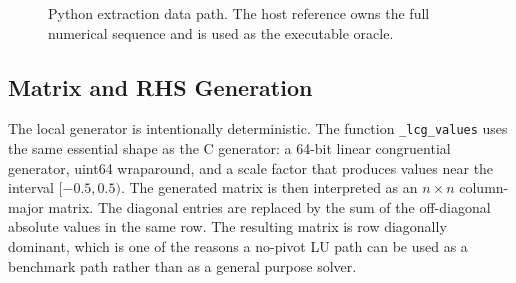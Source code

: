 \documentclass[11pt]{article}
\newcommand{\code}[1]{\texttt{#1}}
\begin{document}
\begin{figure}[htbp]
\centering
{}
\caption{Python extraction data path. The host reference owns the full numerical sequence and is used as the executable oracle.}
\label{fig:python-path}
\end{figure}

\subsection{Matrix and RHS Generation}

The local generator is intentionally deterministic. The function
\code{\_lcg\_values} uses the same essential shape as the C generator: a
64-bit linear congruential generator, uint64 wraparound, and a scale factor
that produces values near the interval \([-0.5,0.5)\). The generated matrix is
then interpreted as an \(n \times n\) column-major matrix. The diagonal entries
are replaced by the sum of the off-diagonal absolute values in the same row.
The resulting matrix is row diagonally dominant, which is one of the reasons a
no-pivot LU path can be used as a benchmark path rather than as a general
purpose solver.
\end{document}
